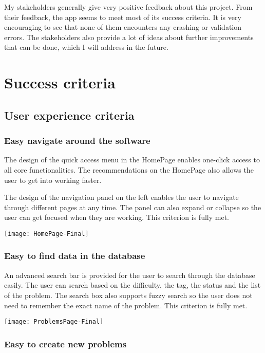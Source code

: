 \documentclass[report.tex]{subfiles}
\begin{document}
My stakeholders generally give very positive feedback about this project. From their feedback, the app seems to meet most of its success criteria. It is very encouraging to see that none of them encounters any crashing or validation errors. The stakeholders also provide a lot of ideas about further improvements that can be done, which I will address in the future.

\section{Success criteria}

\subsection{User experience criteria}

\subsubsection{Easy navigate around the software}

The design of the quick access menu in the HomePage enables one-click access to all core functionalities. The recommendations on the HomePage also allows the user to get into working faster.

The design of the navigation panel on the left enables the user to navigate through different pages at any time. The panel can also expand or collapse so the user can get focused when they are working. This criterion is fully met.

\texttt{[image: HomePage-Final]}

\subsubsection{Easy to find data in the database}

An advanced search bar is provided for the user to search through the database easily. The user can search based on the difficulty, the tag, the status and the list of the problem. The search box also supports fuzzy search so the user does not need to remember the exact name of the problem. This criterion is fully met.

\texttt{[image: ProblemsPage-Final]}

\subsubsection{Easy to create new problems}
\end{document}
